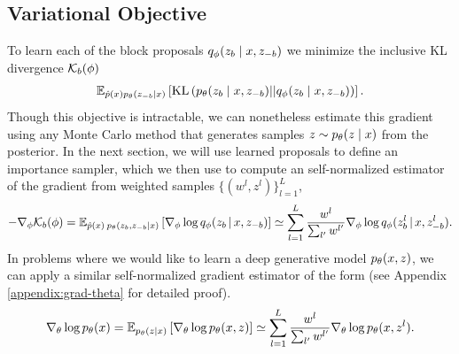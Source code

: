 \documentclass[anonymous=false, %
               format=acmsmall, %
               review=true, %
               screen=true, %
               nonacm=true]{acmart}
\theoremstyle{definition}
\begin{document}
\subsection{Variational Objective} 
To learn each of the block proposals $q_\phi(z_b \mid x, z_{-b})$ we minimize the inclusive KL divergence $\mathcal{K}_b(\phi)$
\begin{align}
    \mathbb{E}_{\hat{p}(x)p_\theta(z_{-b} | x)}
    \left[
    \text{KL}\left(
        p_\theta(z_{b} \mid x, z_{-b})
        ||
        q_\phi(z_{b} \mid x, z_{-b})
    \right)
    \right]. \label{eq:variational_objective}
\end{align}
Though this objective is intractable, we can nonetheless estimate this gradient using any Monte Carlo method that generates samples $z \sim p_\theta(z \mid x)$ from the posterior. In the next section, we will use learned proposals to define an importance sampler, which we then use to compute an self-normalized estimator of the gradient from weighted samples $\{(w^l, z^l)\}_{l=1}^L$, 
\begin{align}
    \label{eq:grad-self-normalized}
    -\nabla_\phi \mathcal{K}_b(\phi)
    =
    \mathbb{E}_{
    \hat{p}(x) \:
    p_\theta(z_{b}, z_{-b} | x)
    }
    \left[
    \nabla_\phi
    \log q_\phi(z_{b} \,|\, x, z_{-b})
    \right]
    \simeq
    \sum_{l=1}^L
    \frac{w^l}{\sum_{l'} w^{l'}}
    \nabla_\phi
    \log q_\phi(z^l_{b} \,|\, x, z^l_{-b})
    .
\end{align}
In problems where we would like to learn a deep generative model $p_\theta(x, z)$, we can apply a similar self-normalized gradient estimator of the form  (see Appendix \ref{appendix:grad-theta} for detailed proof).
\begin{align}
    \label{eq:grad-theta}
    \nabla_\theta \log p_\theta(x) 
    =
    \mathbb{E}_{p_\theta(z | x)} 
    \left[
    \nabla_\theta \log p_\theta(x, z)
    \right]
    \simeq
    \sum_{l=1}^L
    \frac{w^l}{\sum_{l'} w^{l'}}
    \nabla_\theta
    \log p_\theta(x, z^l)
    .
\end{align}
\end{document}
